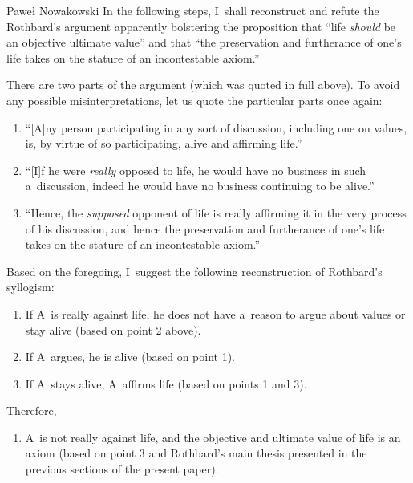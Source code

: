 \begin{artengenv}{Paweł Nowakowski}
In the following steps, I~shall reconstruct and refute the Rothbard's argument apparently bolstering the proposition that ``life \textit{should} be an objective ultimate value'' and that ``the preservation and furtherance of one's life takes on the stature of an incontestable axiom.''



There are two parts of the argument (which was quoted in full above). To avoid any possible misinterpretations, let us quote the particular parts once again:



\begin{enumerate}[label=\arabic*)]

\item ``[A]ny person participating in any sort of discussion, including one on values, is, by virtue of so participating, alive and affirming life.''



\item  ``[I]f he were \textit{really} opposed to life, he would have no business in such a~discussion, indeed he would have no business continuing to be alive.''



\item  ``Hence, the \textit{supposed} opponent of life is really affirming it in the very process of his discussion, and hence the preservation and furtherance of one's life takes on the stature of an incontestable axiom.''

\end{enumerate}

Based on the foregoing, I~suggest the following reconstruction of Rothbard's syllogism:



\begin{enumerate}[label=(\Roman*)]
\item  If A~is really against life, he does not have a~reason to argue about values or stay alive (based on point 2 above).
\item  If A~argues, he is alive (based on point 1).
\item  If A~stays alive, A~affirms life (based on points 1 and 3).
\end{enumerate}
Therefore,
\begin{enumerate}[label=(\Roman*), start=4]
\item A~is not really against life, and the objective and ultimate value of life is an axiom (based on point 3 and Rothbard's main thesis presented in the previous sections of the present paper).


\end{enumerate}
\end{artengenv}
